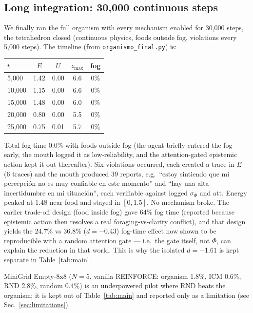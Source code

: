 \documentclass[11pt,a4paper]{article}
\begin{document}
\subsection{Long integration: 30,000 continuous steps}

We finally ran the full organism with every mechanism enabled for 30,000 steps, the tetrahedron closed (continuous physics, foods outside fog, violations every 5,000 steps). The timeline (from \texttt{organismo\_final.py}) is:

\begin{center}
\begin{tabular}{lcccc}
\toprule
$t$ & $E$ & $U$ & $z_{\max}$ & fog \\
\midrule
5,000 & 1.42 & 0.00 & 6.6 & 0\% \\
10,000 & 1.15 & 0.00 & 6.6 & 0\% \\
15,000 & 1.48 & 0.00 & 6.0 & 0\% \\
20,000 & 0.80 & 0.00 & 5.5 & 0\% \\
25,000 & 0.75 & 0.01 & 5.7 & 0\% \\
\bottomrule
\end{tabular}
\end{center}

Total fog time $0.0\%$ with foods outside fog (the agent briefly entered the fog early, the mouth logged it as low-reliability, and the attention-gated epistemic action kept it out thereafter). Six violations occurred, each created a trace in $E$ (6 traces) and the mouth produced 39 reports, e.g.\ ``estoy sintiendo que mi percepci\'on no es muy confiable en este momento'' and ``hay una alta incertidumbre en mi situaci\'on'', each verifiable against logged $\sigma_\Phi$ and $\mathrm{att}$. Energy peaked at $1.48$ near food and stayed in $[0,1.5]$. No mechanism broke. The earlier trade-off design (food inside fog) gave $64\%$ fog time (reported because epistemic action then resolves a real foraging-vs-clarity conflict), and that design yields the $24.7\%$ vs $36.8\%$ ($d=-0.43$) fog-time effect now shown to be reproducible with a random attention gate --- i.e.\ the gate itself, not $\Phi$, can explain the reduction in that world. This is why the isolated $d=-1.61$ is kept separate in Table~\ref{tab:main}.

MiniGrid Empty-8x8 ($N=5$, vanilla REINFORCE: organism 1.8\%, ICM 0.6\%, RND 2.8\%, random 0.4\%) is an underpowered pilot where RND beats the organism; it is kept out of Table~\ref{tab:main} and reported only as a limitation (see Sec.~\ref{sec:limitations}).
\end{document}
